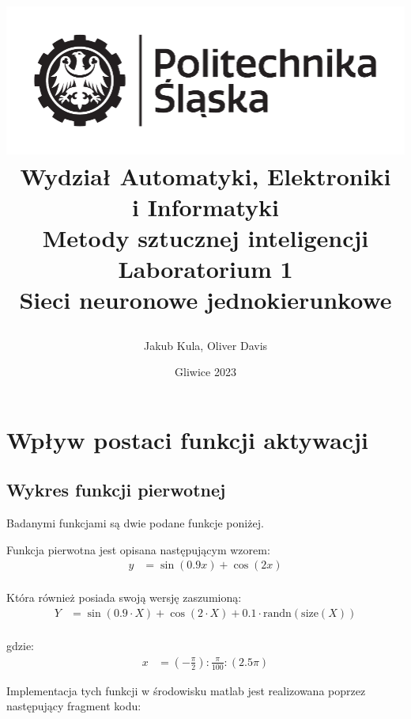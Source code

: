 \documentclass[12pt,titlepage]{article}
\title{
    \includegraphics[scale=0.75]{img/politechnika_sl_logo_bw_poziom_pl-eps-converted-to}\\
    \textbf{Wydział Automatyki, Elektroniki\\
    i Informatyki}\\
    \vspace*{1cm}
    Metody sztucznej inteligencji \\ Laboratorium 1 \\ Sieci neuronowe jednokierunkowe

    \vspace*{5cm}
}
\author{
    Jakub Kula,
    Oliver Davis
}
\date{Gliwice 2023}
\begin{document}
    \maketitle

    \tableofcontents
    \newpage
        \section{Wpływ postaci funkcji aktywacji}

        \subsection{Wykres funkcji pierwotnej}

    Badanymi funkcjami są dwie podane funkcje poniżej.

        Funkcja pierwotna jest opisana następującym wzorem:
        \begin{align*}
            y &= \sin(0.9x) + \cos(2x) \\
        \end{align*}

        Która również posiada swoją wersję zaszumioną:
        \begin{align*}
            Y &= \sin(0.9 \cdot X) + \cos(2 \cdot X) + 0.1 \cdot \text{randn}(\text{size}(X)) \\
        \end{align*}

        gdzie:
        \begin{align*}
            x &= \left(-\frac{\pi}{2}\right) : \frac{\pi}{100} : \left(2.5 \pi\right)
        \end{align*}

    Implementacja tych funkcji w środowisku matlab jest realizowana poprzez następujący fragment kodu:\newline
    
\end{document}
